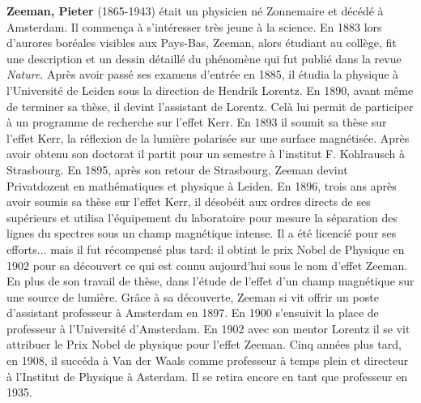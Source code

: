 \textbf{Zeeman, Pieter} (1865-1943) était un physicien né Zonnemaire et décédé à Amsterdam. Il commença à s'intéresser très jeune à la science. En 1883 lors d'aurores boréales visibles aux Pays-Bas, Zeeman, alors étudiant au collège, fit une description et un dessin détaillé du phénomène qui fut publié dans la revue \textit{Nature}. Après avoir passé ses examens d'entrée en 1885, il étudia la physique à l'Université de Leiden sous la direction de Hendrik Lorentz. En 1890, avant même de terminer sa thèse, il devint l'assistant de Lorentz. Celà lui permit de participer à un programme de recherche sur l'effet Kerr. En 1893 il soumit sa thèse sur l'effet Kerr, la réflexion de la lumière polarisée sur une surface magnétisée. Après avoir obtenu son doctorat il partit pour un semestre à l'institut F. Kohlrausch à Strasbourg. En 1895, après son retour de Strasbourg, Zeeman devint Privatdozent en mathématiques et physique à Leiden. En 1896, trois ans après avoir soumis sa thèse sur l'effet Kerr, il désobéit aux ordres directs de ses supérieurs et utilisa l'équipement du laboratoire pour mesure la séparation des lignes du spectres sous un champ magnétique intense. Il a été licencié pour ses efforts... mais il fut récompensé plus tard: il obtint le prix Nobel de Physique en 1902 pour sa découvert ce qui est connu aujourd'hui sous le nom d'effet Zeeman. En plus de son travail de thèse, dans l'étude de l'effet d'un champ magnétique sur une source de lumière. Grâce à sa découverte, Zeeman si vit offrir un poste d'assistant professeur à Amsterdam en 1897. En 1900 s'ensuivit la place de professeur à l'Université d'Amsterdam. En 1902 avec son mentor Lorentz il se vit attribuer le Prix Nobel de physique pour l'effet Zeeman. Cinq années plus tard, en 1908, il succéda à Van der Waals comme professeur à temps plein et directeur à l'Institut de Physique à Asterdam. Il se retira encore en tant que professeur en 1935.
